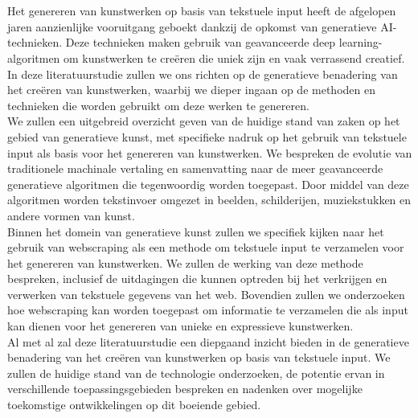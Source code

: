 \chapter{}%
\label{ch:stand-van-zaken}



Het genereren van kunstwerken op basis van tekstuele input heeft de afgelopen jaren aanzienlijke vooruitgang geboekt dankzij de opkomst van generatieve AI-technieken. Deze technieken maken gebruik van geavanceerde deep learning-algoritmen om kunstwerken te creëren die uniek zijn en vaak verrassend creatief. In deze literatuurstudie zullen we ons richten op de generatieve benadering van het creëren van kunstwerken, waarbij we dieper ingaan op de methoden en technieken die worden gebruikt om deze werken te genereren. \\

We zullen een uitgebreid overzicht geven van de huidige stand van zaken op het gebied van generatieve kunst, met specifieke nadruk op het gebruik van tekstuele input als basis voor het genereren van kunstwerken. We bespreken de evolutie van traditionele machinale vertaling en samenvatting naar de meer geavanceerde generatieve algoritmen die tegenwoordig worden toegepast. Door middel van deze algoritmen worden tekstinvoer omgezet in beelden, schilderijen, muziekstukken en andere vormen van kunst. \\

Binnen het domein van generatieve kunst zullen we specifiek kijken naar het gebruik van webscraping als een methode om tekstuele input te verzamelen voor het genereren van kunstwerken. We zullen de werking van deze methode bespreken, inclusief de uitdagingen die kunnen optreden bij het verkrijgen en verwerken van tekstuele gegevens van het web. Bovendien zullen we onderzoeken hoe webscraping kan worden toegepast om informatie te verzamelen die als input kan dienen voor het genereren van unieke en expressieve kunstwerken. \\

Al met al zal deze literatuurstudie een diepgaand inzicht bieden in de generatieve benadering van het creëren van kunstwerken op basis van tekstuele input. We zullen de huidige stand van de technologie onderzoeken, de potentie ervan in verschillende toepassingsgebieden bespreken en nadenken over mogelijke toekomstige ontwikkelingen op dit boeiende gebied.
\pagebreak


